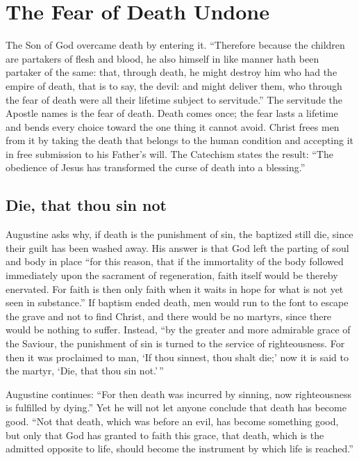 \section{The Fear of Death Undone}

The Son of God overcame death by entering it. ``Therefore because the children are partakers of flesh and blood, he also himself in like manner hath been partaker of the same: that, through death, he might destroy him who had the empire of death, that is to say, the devil: and might deliver them, who through the fear of death were all their lifetime subject to servitude.'' The servitude the Apostle names is the fear of death. Death comes once; the fear lasts a lifetime and bends every choice toward the one thing it cannot avoid. Christ frees men from it by taking the death that belongs to the human condition and accepting it in free submission to his Father's will. The Catechism states the result: ``The obedience of Jesus has transformed the curse of death into a blessing.''

\subsection{Die, that thou sin not}

Augustine asks why, if death is the punishment of sin, the baptized still die, since their guilt has been washed away. His answer is that God left the parting of soul and body in place ``for this reason, that if the immortality of the body followed immediately upon the sacrament of regeneration, faith itself would be thereby enervated. For faith is then only faith when it waits in hope for what is not yet seen in substance.'' If baptism ended death, men would run to the font to escape the grave and not to find Christ, and there would be no martyrs, since there would be nothing to suffer. Instead, ``by the greater and more admirable grace of the Saviour, the punishment of sin is turned to the service of righteousness. For then it was proclaimed to man, `If thou sinnest, thou shalt die;' now it is said to the martyr, `Die, that thou sin not.'\,''

Augustine continues: ``For then death was incurred by sinning, now righteousness is fulfilled by dying.'' Yet he will not let anyone conclude that death has become good. ``Not that death, which was before an evil, has become something good, but only that God has granted to faith this grace, that death, which is the admitted opposite to life, should become the instrument by which life is reached.''

